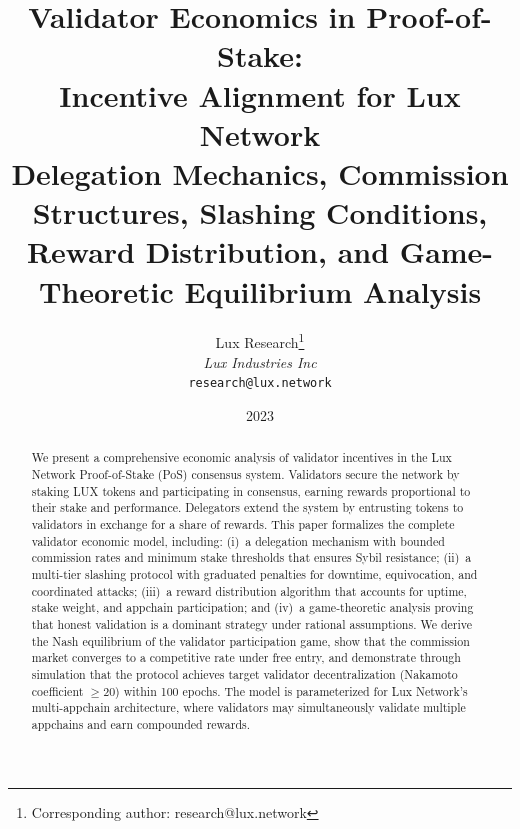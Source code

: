 \documentclass[11pt,a4paper]{article}
\title{\textbf{Validator Economics in Proof-of-Stake:\\Incentive Alignment for Lux Network}\\[6pt]
\large Delegation Mechanics, Commission Structures, Slashing Conditions,\\Reward Distribution, and Game-Theoretic Equilibrium Analysis}
\author{
Lux Research\thanks{Corresponding author: research@lux.network}\\
\textit{Lux Industries Inc}\\
\texttt{research@lux.network}
}
\date{2023}
\begin{document}
\luxcoverpage

\begin{abstract}
We present a comprehensive economic analysis of validator incentives in the Lux Network Proof-of-Stake (PoS) consensus system. Validators secure the network by staking LUX tokens and participating in consensus, earning rewards proportional to their stake and performance. Delegators extend the system by entrusting tokens to validators in exchange for a share of rewards. This paper formalizes the complete validator economic model, including: (i)~a delegation mechanism with bounded commission rates and minimum stake thresholds that ensures Sybil resistance; (ii)~a multi-tier slashing protocol with graduated penalties for downtime, equivocation, and coordinated attacks; (iii)~a reward distribution algorithm that accounts for uptime, stake weight, and appchain participation; and (iv)~a game-theoretic analysis proving that honest validation is a dominant strategy under rational assumptions. We derive the Nash equilibrium of the validator participation game, show that the commission market converges to a competitive rate under free entry, and demonstrate through simulation that the protocol achieves target validator decentralization (Nakamoto coefficient $\geq 20$) within 100 epochs. The model is parameterized for Lux Network's multi-appchain architecture, where validators may simultaneously validate multiple appchains and earn compounded rewards.
\end{abstract}














\end{document}
